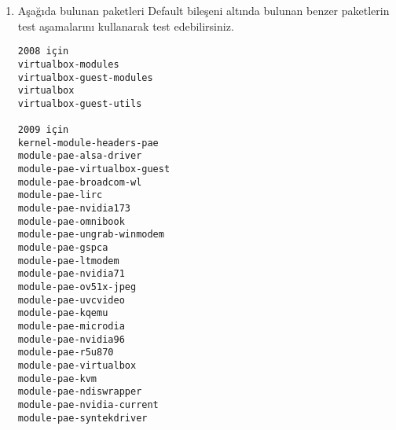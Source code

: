 \documentclass[a4paper,10pt]{article}
\begin{document}
\begin{enumerate}
\item Aşağıda bulunan paketleri Default bileşeni altında bulunan benzer paketlerin test aşamalarını kullanarak test edebilirsiniz.

\begin{verbatim}
2008 için
virtualbox-modules
virtualbox-guest-modules
virtualbox
virtualbox-guest-utils

2009 için
kernel-module-headers-pae
module-pae-alsa-driver
module-pae-virtualbox-guest
module-pae-broadcom-wl
module-pae-lirc
module-pae-nvidia173
module-pae-omnibook
module-pae-ungrab-winmodem
module-pae-gspca
module-pae-ltmodem
module-pae-nvidia71
module-pae-ov51x-jpeg
module-pae-uvcvideo
module-pae-kqemu
module-pae-microdia
module-pae-nvidia96
module-pae-r5u870
module-pae-virtualbox
module-pae-kvm
module-pae-ndiswrapper
module-pae-nvidia-current
module-pae-syntekdriver   
\end{verbatim}
\end{enumerate}
\end{document}
